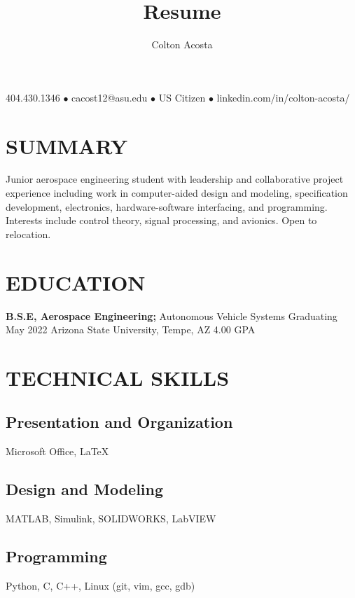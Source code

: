 \documentclass{article}
\makeatletter
\renewcommand{\maketitle}{
	\begin{center}
		{\huge\bfseries
			\theauthor}
			
		404.430.1346 $\bullet$ cacost12@asu.edu $\bullet$ US Citizen $\bullet$ linkedin.com/in/colton-acosta/
	\end{center}
}
\makeatother
\begin{document}
\title{Resume}
\author{Colton Acosta}
\maketitle
\section{SUMMARY}
Junior aerospace engineering student with leadership and collaborative project experience including work in computer-aided design and modeling, specification development, electronics, hardware-software interfacing, and programming. Interests include control theory, signal processing, and avionics. Open to relocation.
\section{EDUCATION}
\textbf{B.S.E, Aerospace Engineering;} Autonomous Vehicle Systems
\hfill 
Graduating May 2022
\linebreak
Arizona State University, Tempe, AZ 
\hfill
4.00 GPA

\section{TECHNICAL SKILLS}
\subsection{Presentation and Organization}
Microsoft Office,  {\LaTeX}
\subsection{Design and Modeling}
MATLAB, Simulink, SOLIDWORKS, LabVIEW
\subsection{Programming} 
Python, C, C++, Linux (git, vim, gcc, gdb)
\end{document}
